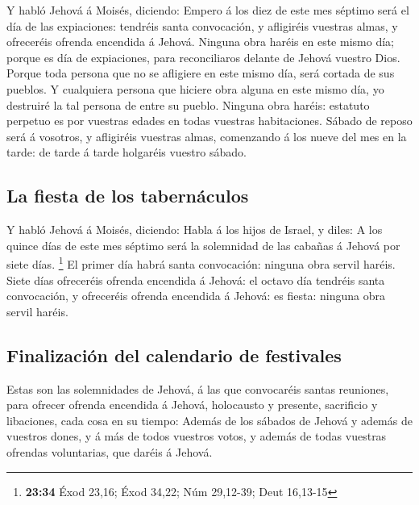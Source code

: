  Y habló Jehová á Moisés, diciendo: 
Empero á los diez de este mes séptimo será el día de las expiaciones:
tendréis santa convocación, y afligiréis vuestras almas, y ofreceréis
ofrenda encendida á Jehová.  Ninguna obra haréis en este
mismo día; porque es día de expiaciones, para reconciliaros delante de
Jehová vuestro Dios.  Porque toda persona que no se
afligiere en este mismo día, será cortada de sus pueblos.
 Y cualquiera persona que hiciere obra alguna en este
mismo día, yo destruiré la tal persona de entre su pueblo.
 Ninguna obra haréis: estatuto perpetuo es por vuestras
edades en todas vuestras habitaciones.  Sábado de reposo
será á vosotros, y afligiréis vuestras almas, comenzando á los nueve del
mes en la tarde: de tarde á tarde holgaréis vuestro sábado.

\hypertarget{la-fiesta-de-los-tabernuxe1culos}{%
\subsection{La fiesta de los
tabernáculos}\label{la-fiesta-de-los-tabernuxe1culos}}

 Y habló Jehová á Moisés, diciendo:  Habla
á los hijos de Israel, y diles: A los quince días de este mes séptimo
será la solemnidad de las cabañas á Jehová por siete días. \footnote{\textbf{23:34}
  Éxod 23,16; Éxod 34,22; Núm 29,12-39; Deut 16,13-15} 
El primer día habrá santa convocación: ninguna obra servil haréis.
 Siete días ofreceréis ofrenda encendida á Jehová: el
octavo día tendréis santa convocación, y ofreceréis ofrenda encendida á
Jehová: es fiesta: ninguna obra servil haréis.

\hypertarget{finalizaciuxf3n-del-calendario-de-festivales}{%
\subsection{Finalización del calendario de
festivales}\label{finalizaciuxf3n-del-calendario-de-festivales}}

 Estas son las solemnidades de Jehová, á las que
convocaréis santas reuniones, para ofrecer ofrenda encendida á Jehová,
holocausto y presente, sacrificio y libaciones, cada cosa en su tiempo:
 Además de los sábados de Jehová y además de vuestros
dones, y á más de todos vuestros votos, y además de todas vuestras
ofrendas voluntarias, que daréis á Jehová.

